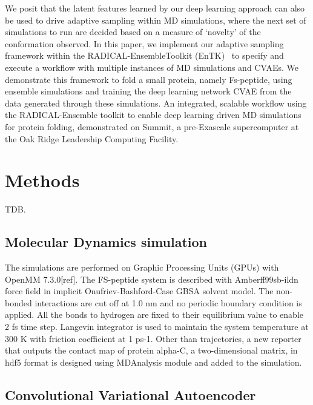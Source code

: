 \documentclass[conference,final]{IEEEtran}
\begin{document}
We posit that the latent features learned by our deep learning approach can
also be used to drive adaptive sampling within MD simulations, where the next
set of simulations to run are decided based on a measure of ‘novelty’ of the
conformation observed. In this paper, we implement our adaptive sampling
framework within the RADICAL-EnsembleToolkit
(EnTK)~\cite{balasubramanian2018harnessing} to specify and execute a workflow
with multiple instances of MD simulations and CVAEs. We demonstrate this
framework to fold a small protein, namely Fs-peptide, using ensemble
simulations and training the deep learning network CVAE from the data
generated through these simulations. An integrated, scalable workflow using
the RADICAL-Ensemble toolkit to enable deep learning driven MD simulations
for protein folding, demonstrated on Summit, a pre-Exascale supercomputer at
the Oak Ridge Leadership Computing Facility.

\section{Methods} 

TDB\@.

\subsection{Molecular Dynamics simulation}

The simulations are performed on Graphic Processing Units (GPUs) with OpenMM
7.3.0[ref]. The FS-peptide system is described with Amberff99sb-ildn force
field in implicit Onufriev-Bashford-Case GBSA solvent model. The non-bonded
interactions are cut off at 1.0 nm and no periodic boundary condition is
applied. All the bonds to hydrogen are fixed to their equilibrium value to
enable 2 fs time step. Langevin integrator is used to maintain the system
temperature at 300 K with friction coefficient at 1 ps-1. Other than
trajectories, a new reporter that outputs the contact map of protein alpha-C,
a two-dimensional matrix, in hdf5 format is designed using MDAnalysis module
and added to the simulation.

\subsection{Convolutional Variational Autoencoder}
\end{document}
